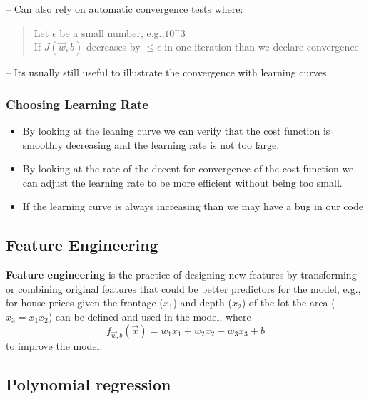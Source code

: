 \documentclass[11pt,letterpaper]{article}
\begin{document}
\begin{notebox}
	-- Can also rely on automatic convergence tests where:
	\begin{quote}
		Let $\epsilon$ be a small number, e.g.,$10^-3$ \\
		If $J(\vec{w},b)$ decreases by $\leq \epsilon$ in one iteration than we declare convergence
	\end{quote}
	
	-- Its usually still useful to illustrate the convergence with learning curves
\end{notebox}

\subsubsection{Choosing Learning Rate}

\begin{notebox}
	\begin{itemize}[leftmargin=*]
		\item By looking at the leaning curve we can verify that the cost
	 function is smoothly decreasing and the learning rate is not too large.
		\item By looking at the rate of the decent for convergence of the cost function we can adjust the learning rate to be more efficient without being too small.
		\item If the learning curve is always increasing than we may have a bug in our code
	\end{itemize}	
\end{notebox}

\subsection{Feature Engineering}

\begin{definitionbox}
	\textbf{Feature engineering} is the practice of designing new features by  transforming or combining original features that could be better predictors for the model, e.g., for house prices given the frontage ($x_1$) and depth ($x_2$) of the lot the area ($x_3=x_1x_2$) can be defined and used in the model, where
	\[ 
	f_{\vec{w},b}(\vec{x}) = w_1x_1+w_2x_2+w_3x_3 +b
	\]
to improve the model.
\end{definitionbox}

\subsection{Polynomial regression}
\end{document}
